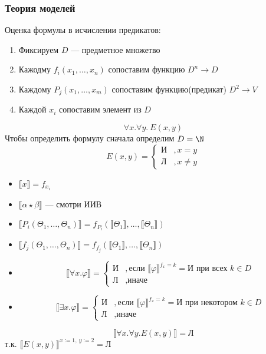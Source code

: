 \documentclass[english]{article}
\begin{document}
\subsubsection{Теория моделей}
\label{sec:org7baf089}
Оценка формулы в исчислении предикатов:
\begin{enumerate}
	\item Фиксируем \(D\) --- предметное множетво
	\item Кажодму \(f_i(x_1, \dots, x_n)\) сопоставим функцию \(D^n \to D\)
	\item Каждому \(P_j(x_1, \dots, x_m)\) сопоставим функцию(предикат) \(D^2 \to V\)
	\item Каждой \(x_i\) сопоставим элемент из \(D\)
\end{enumerate}
\begin{examp}
	\[\forall x.\forall y.\ E(x, y)\]
	Чтобы определить формулу сначала определим \(D = \N\)
	\[ E(x, y) = \begin{cases}\text{И} & ,x = y \\ \text{Л} &, x\neq y\end{cases} \]
	\begin{itemize}
		\item \(\llbracket x \rrbracket = f_{x_i}\)
		\item \(\llbracket \alpha \star \beta \rrbracket\) --- смотри ИИВ
		\item \(\llbracket P_i(\Theta_1, \dots , \Theta_n) \rrbracket = f_{P_i}(\llbracket \Theta_1 \rrbracket, \dots, \llbracket \Theta_n \rrbracket)\)
		\item \(\llbracket f_j(\Theta_1 , \dots, \Theta_n ) \rrbracket = f_{f_j}(\llbracket \Theta_1 \rrbracket, \dots, \llbracket \Theta_n \rrbracket)\)
		\item \[ \llbracket \forall x. \varphi \rrbracket = \begin{cases} \text{И} & , \text{если } \llbracket \varphi \rrbracket^{f_x = k} = \text{И}\text{ при всех } k \in D  \\ \text{Л} &,\text{иначе}\end{cases} \]
		\item \[ \llbracket \exists x.\varphi \rrbracket = \begin{cases} \text{И} &, \text{если } \llbracket \varphi \rrbracket^{f_x = k} = \text{И при некотором } k \in D \\ \text{Л} &,\text{иначе} \end{cases} \]
	\end{itemize}
	\[ \llbracket \forall x.\forall y.E(x, y) \rrbracket = \text{Л} \]
	т.к. \(\llbracket E(x, y) \rrbracket^{x:=1,\ y:=2} = \text{Л}\)
\end{examp}
\newcommand{\colorboxed}[2]{\,\color{#1}\fbox{\color{black}#2}\color{black}\,}
\end{document}
